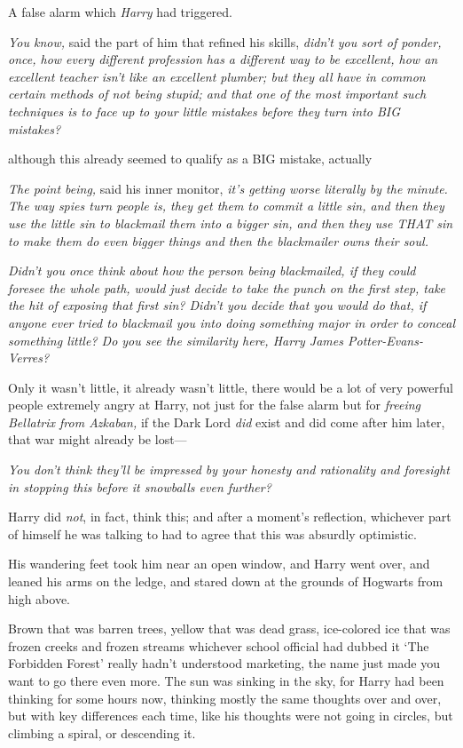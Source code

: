 A false alarm which \emph{Harry} had triggered.

\emph{You know,} said the part of him that refined his skills, \emph{didn't you
sort of ponder, once, how every different profession has a different way to be
excellent, how an excellent teacher isn't like an excellent plumber; but they
all have in common certain methods of not being stupid; and that one of the
most important such techniques is to face up to your little mistakes before
they turn into BIG mistakes?}

{\el} although this already seemed to qualify as a BIG mistake,
actually{\el}

\emph{The point being,} said his inner monitor, \emph{it's getting worse
literally by the minute. The way spies turn people is, they get them to commit
a little sin, and then they use the little sin to blackmail them into a bigger
sin, and then they use THAT sin to make them do even bigger things and then the
blackmailer owns their soul.}

\emph{Didn't you once think about how the person being blackmailed, if they
could foresee the whole path, would just decide to take the punch on the first
step, take the hit of exposing that first sin? Didn't you decide that you would
do that, if anyone ever tried to blackmail you into doing something major in
order to conceal something little? Do you see the similarity here, Harry James
Potter-Evans-Verres?}

Only it wasn't little, it already wasn't little, there would be a lot of very
powerful people extremely angry at Harry, not just for the false alarm but for
\emph{freeing Bellatrix from Azkaban,} if the Dark Lord \emph{did} exist and
did come after him later, that war might already be lost---

\emph{You don't think they'll be impressed by your honesty and rationality and
foresight in stopping this before it snowballs even further?}

Harry did \emph{not}, in fact, think this; and after a moment's reflection,
whichever part of himself he was talking to had to agree that this was
absurdly optimistic.

His wandering feet took him near an open window, and Harry went over, and
leaned his arms on the ledge, and stared down at the grounds of Hogwarts from
high above.

Brown that was barren trees, yellow that was dead grass, ice-colored ice that
was frozen creeks and frozen streams{\el} whichever school official had
dubbed it `The Forbidden Forest' really hadn't understood marketing, the name
just made you want to go there even more. The sun was sinking in the sky, for
Harry had been thinking for some hours now, thinking mostly the same thoughts
over and over, but with key differences each time, like his thoughts were not
going in circles, but climbing a spiral, or descending it.

